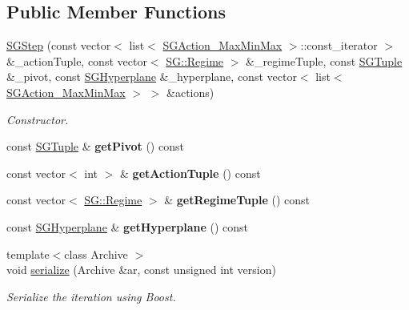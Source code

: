 \subsection*{Public Member Functions}
\begin{DoxyCompactItemize}
\item 
\mbox{\label{classSGStep_a62bc546fa89ae0c09a8cc49ed500022e}} 
\hyperlink{classSGStep_a62bc546fa89ae0c09a8cc49ed500022e}{S\+G\+Step} (const vector$<$ list$<$ \hyperlink{classSGAction__MaxMinMax}{S\+G\+Action\+\_\+\+Max\+Min\+Max} $>$\+::const\+\_\+iterator $>$ \&\+\_\+action\+Tuple, const vector$<$ \hyperlink{namespaceSG_a139e4dec41ea0f38aae1f93f60cfff60}{S\+G\+::\+Regime} $>$ \&\+\_\+regime\+Tuple, const \hyperlink{classSGTuple}{S\+G\+Tuple} \&\+\_\+pivot, const \hyperlink{classSGHyperplane}{S\+G\+Hyperplane} \&\+\_\+hyperplane, const vector$<$ list$<$ \hyperlink{classSGAction__MaxMinMax}{S\+G\+Action\+\_\+\+Max\+Min\+Max} $>$ $>$ \&actions)
\begin{DoxyCompactList}\small\item\em Constructor. \end{DoxyCompactList}\item 
\mbox{\label{classSGStep_ae546a7cfc2562b51fa980c39173cf459}} 
const \hyperlink{classSGTuple}{S\+G\+Tuple} \& {\bfseries get\+Pivot} () const
\item 
\mbox{\label{classSGStep_ae5c0b344c3f2bba1b5f74960d6ad0738}} 
const vector$<$ int $>$ \& {\bfseries get\+Action\+Tuple} () const
\item 
\mbox{\label{classSGStep_a8eed3d8860ee53b882cdf3b46dd19233}} 
const vector$<$ \hyperlink{namespaceSG_a139e4dec41ea0f38aae1f93f60cfff60}{S\+G\+::\+Regime} $>$ \& {\bfseries get\+Regime\+Tuple} () const
\item 
\mbox{\label{classSGStep_a05700c14bb802be3c69b73a616dcdff8}} 
const \hyperlink{classSGHyperplane}{S\+G\+Hyperplane} \& {\bfseries get\+Hyperplane} () const
\item 
\mbox{\label{classSGStep_a8a39fd55b2aeaa9162d056720f51a97e}} 
{\footnotesize template$<$class Archive $>$ }\\void \hyperlink{classSGStep_a8a39fd55b2aeaa9162d056720f51a97e}{serialize} (Archive \&ar, const unsigned int version)
\begin{DoxyCompactList}\small\item\em Serialize the iteration using Boost. \end{DoxyCompactList}\end{DoxyCompactItemize}
